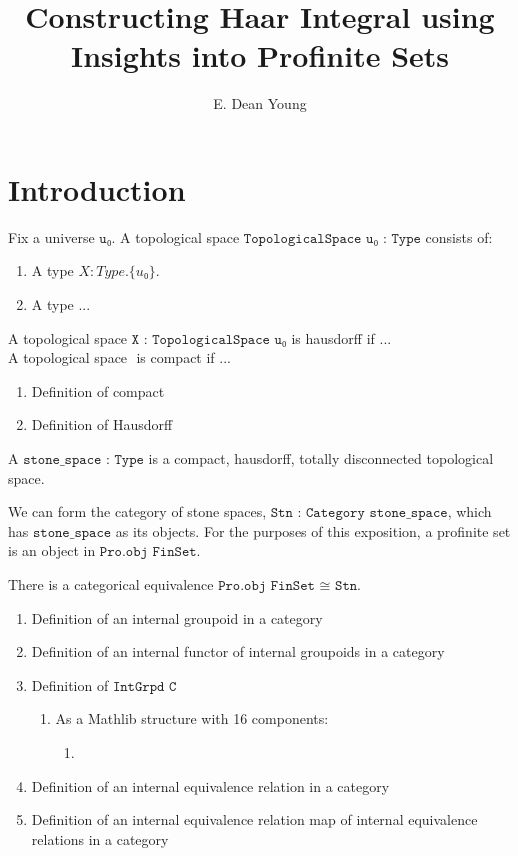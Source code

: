 \documentclass[13pt]{amsart}
\title{Constructing Haar Integral using Insights into Profinite Sets}
\author{E. Dean Young}
\begin{document}
\section{Introduction}

Fix a universe $\texttt{u₀}$. A topological space $\texttt{TopologicalSpace u₀ : Type}$ consists of:

\begin{enumerate}
\item A type $X : Type.\{u₀\}$.
\item A type ...
\end{enumerate}

A topological space $\texttt{X : TopologicalSpace u₀}$ is hausdorff if ...\\

A topological space $\texttt{}$ is compact if ...

\begin{enumerate}
\item Definition of compact
\item Definition of Hausdorff
\end{enumerate}

A $\texttt{stone\_space : Type}$ is a compact, hausdorff, totally disconnected topological space. 

We can form the category of stone spaces, $\texttt{Stn : Category stone\_space}$, which has $\texttt{stone\_space}$ as its objects. For the purposes of this exposition, a profinite set is an object in $\texttt{Pro.obj FinSet}$. 

There is a categorical equivalence $\texttt{Pro.obj FinSet ≅ Stn}$.

\begin{enumerate}
\item Definition of an internal groupoid in a category
\item Definition of an internal functor of internal groupoids in a category
\item Definition of $\texttt{IntGrpd C}$
\begin{enumerate}
\item As a Mathlib structure with 16 components:
\begin{enumerate}
\item 
\end{enumerate}
\end{enumerate}
\item Definition of an internal equivalence relation in a category
\item Definition of an internal equivalence relation map of internal equivalence relations in a category
\end{enumerate}
\end{document}
